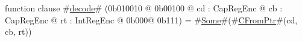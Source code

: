 function clause #\hyperref[sailMIPSzdecode]{decode}# (0b010010 @ 0b00100 @ cd : CapRegEnc @ cb : CapRegEnc @ rt : IntRegEnc @ 0b000@ 0b111) = #\hyperref[sailMIPSzSome]{Some}#(#\hyperref[sailMIPSzCFromPtr]{CFromPtr}#(cd, cb, rt))

